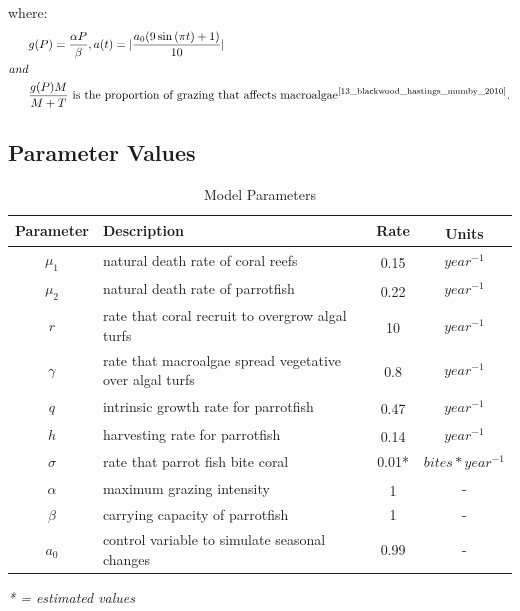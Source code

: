 \documentclass[12pt]{article}
\begin{document}
where: 
\begin{align*}
&g(P) = \frac{\alpha P}{\beta}, a(t)=|\frac{a_{0}(9\sin{(\pi t) }+1)}{10}|\\
and\\
&\frac{g(P)M}{M + T} \text{ is the proportion of grazing that affects macroalgae} \textsuperscript{\cite{13_blackwood_hastings_mumby_2010}}.
\end{align*}


\subsection{Parameter Values}
\begin{table}[H]
    \centering
    \begin{tabular}{c p{9cm} c c}
        \hline
        Parameter & Description & Rate & Units\textsuperscript{\cite{12_noaa_report}\cite{04_mathanalysis}\cite{13_blackwood_hastings_mumby_2010}}\\
        \hline
        \hline
        $\mu_{1}$ & natural death rate of coral reefs & 0.15\textsuperscript{\cite{16_wolanski_richmond_mccook_2004}} & $year^{-1}$\\ %
        $\mu_{2}$ & natural death rate of parrotfish & 0.22\textsuperscript{\cite{12_noaa_report}} & $year^{-1}$\\ %
        $r$ & rate that coral recruit to overgrow algal turfs & 10\textsuperscript{\cite{16_wolanski_richmond_mccook_2004}} & $year^{-1}$\\ %
        $\gamma$ & rate that macroalgae spread vegetative over algal turfs & 0.8\textsuperscript{\cite{11_zikkah_anggriani_supriatna_2020}} & $year^{-1}$\\ %
        $q$ & intrinsic growth rate for parrotfish & 0.47\textsuperscript{\cite{12_noaa_report}} & $year^{-1}$\\ %
        $h$ & harvesting rate for parrotfish & 0.14\textsuperscript{\cite{12_noaa_report}} & $year^{-1}$\\ %
        $\sigma$ & rate that parrot fish bite coral & 0.01*& $bites*year^{-1}$\\
        $\alpha$ & maximum grazing intensity & 1\textsuperscript{\cite{13_blackwood_hastings_mumby_2010}} & -\\
        $\beta$ & carrying capacity of parrotfish & 1 & -\\
        $a_{0}$ & control variable to simulate seasonal changes & 0.99 & - \\%
        \hline
    \end{tabular}
    \caption{Model Parameters}
    \label{tab:parameters}
\end{table}
\textit{* = estimated values}
\end{document}
